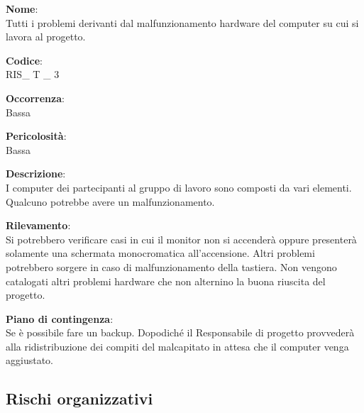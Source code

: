 {\setlength{\parindent}{0cm}
\begin{minipage}{\textwidth} 
\begin{multicols}{4}
\textbf{Nome}: \\ Tutti i problemi derivanti dal malfunzionamento hardware del computer su cui si lavora al progetto. \columnbreak

\textbf{Codice}: \\ RIS\_ T \_ 3
\columnbreak

\textbf{Occorrenza}: \\ Bassa 
\columnbreak

\textbf{Pericolosità}: \\ Bassa

\end{multicols}

\begin{multicols}{3}

\textbf{Descrizione}: \\ I computer dei partecipanti al gruppo di lavoro sono composti da vari elementi. Qualcuno potrebbe avere un malfunzionamento.
\columnbreak

\textbf{Rilevamento}: \\ Si potrebbero verificare casi in cui il monitor non si accenderà oppure presenterà solamente una schermata monocromatica all'accensione. Altri problemi potrebbero sorgere in caso di malfunzionamento della tastiera. Non vengono catalogati altri problemi hardware che non alternino la buona riuscita del progetto. 
\columnbreak

\textbf{Piano di contingenza}: \\ Se è possibile fare un backup. Dopodiché il Responsabile di progetto provvederà alla ridistribuzione dei compiti del malcapitato in attesa che il computer venga aggiustato.\\

\columnbreak
\end{multicols}
\end{minipage}}

\subsection{Rischi organizzativi}

